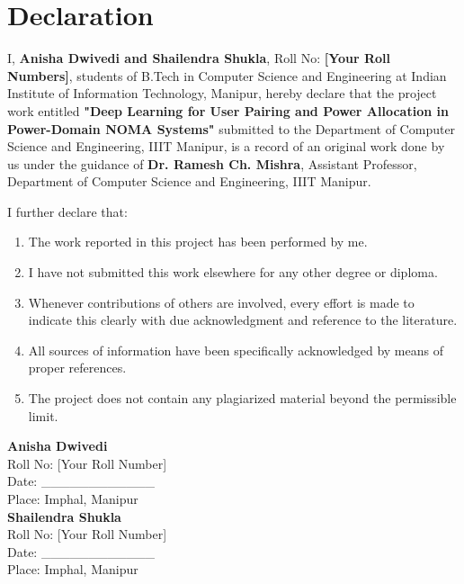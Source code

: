 \chapter*{Declaration}

\vspace{1cm}

I, \textbf{Anisha Dwivedi and Shailendra Shukla}, Roll No: \textbf{[Your Roll Numbers]}, students of B.Tech in Computer Science and Engineering at Indian Institute of Information Technology, Manipur, hereby declare that the project work entitled \textbf{"Deep Learning for User Pairing and Power Allocation in Power-Domain NOMA Systems"} submitted to the Department of Computer Science and Engineering, IIIT Manipur, is a record of an original work done by us under the guidance of \textbf{Dr. Ramesh Ch. Mishra}, Assistant Professor, Department of Computer Science and Engineering, IIIT Manipur.

\vspace{1cm}

I further declare that:
\begin{enumerate}
    \item The work reported in this project has been performed by me.
    \item I have not submitted this work elsewhere for any other degree or diploma.
    \item Whenever contributions of others are involved, every effort is made to indicate this clearly with due acknowledgment and reference to the literature.
    \item All sources of information have been specifically acknowledged by means of proper references.
    \item The project does not contain any plagiarized material beyond the permissible limit.
\end{enumerate}

\vspace{2cm}

\begin{flushright}
\textbf{Anisha Dwivedi} \\
Roll No: [Your Roll Number] \\
Date: \_\_\_\_\_\_\_\_\_\_\_\_ \\
Place: Imphal, Manipur \\[1cm]

\textbf{Shailendra Shukla} \\
Roll No: [Your Roll Number] \\
Date: \_\_\_\_\_\_\_\_\_\_\_\_ \\
Place: Imphal, Manipur
\end{flushright}

\newpage
